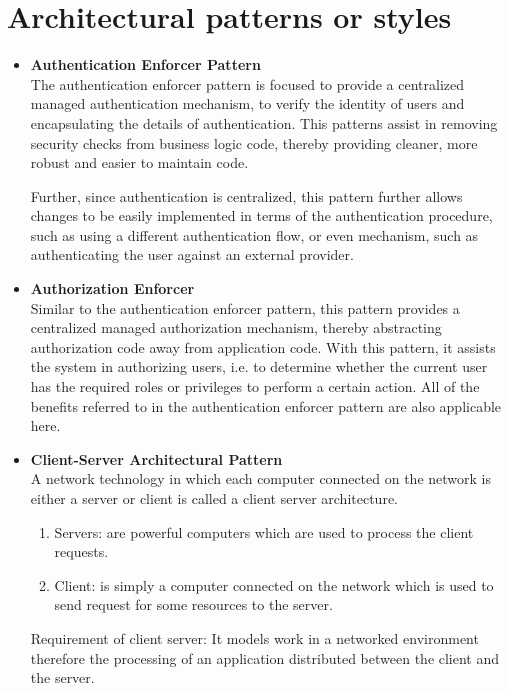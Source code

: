 \documentclass[a4paper,10pt]{article}
\begin{document}
\section{Architectural patterns or styles}
	\begin{itemize}
		\item \textbf{Authentication Enforcer Pattern} \\
		The authentication enforcer pattern is focused to provide a centralized managed authentication mechanism, to verify the identity of users and encapsulating the details of authentication. This patterns assist in removing security checks from business logic code, thereby providing cleaner, more robust and easier to maintain code.

		Further, since authentication is centralized, this pattern further allows changes to be easily implemented in terms of the authentication procedure, such as using a different authentication flow, or even mechanism, such as authenticating the user against an external provider.

		\item \textbf{Authorization Enforcer} \\
				Similar to the authentication enforcer pattern, this pattern provides a centralized managed authorization mechanism, thereby abstracting authorization code away from application code.  With this pattern, it assists the system in authorizing users, i.e. to determine whether the current user has the required roles or privileges to perform a certain action. All of the benefits referred to in the authentication enforcer pattern are also applicable here.

		\item \textbf{Client-Server Architectural Pattern}\\
				A network technology in which each computer connected on the network is either a server or client is called a client server architecture.
				\begin{enumerate}
					\item Servers: are powerful computers which are used to process the client requests.
					\item Client: is simply a computer connected on the network which is used to send request for some resources to the server.
				\end{enumerate}
				Requirement of client server: It models work in a networked environment therefore the processing of an application distributed between the client and the server.


\end{itemize}
\end{document}
